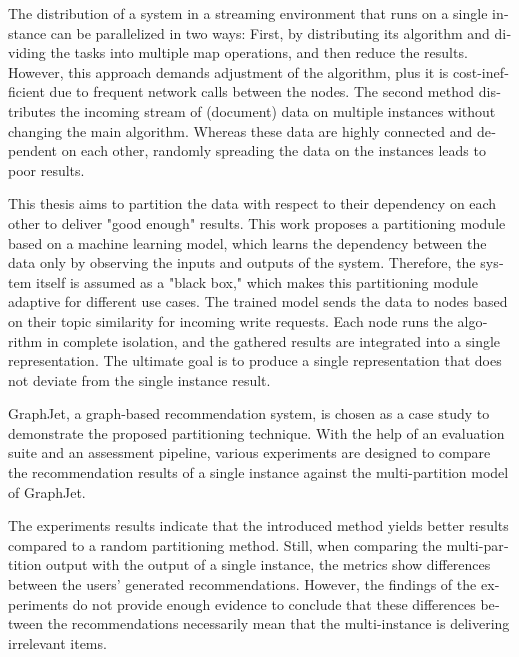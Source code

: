 
\null\vfil
\begin{otherlanguage}{english}
\begin{center}\textsf{\textbf{\abstractname}}\end{center}

\noindent
The distribution of a system in a streaming environment that runs on a single instance can be parallelized in two ways: First, by distributing its algorithm and dividing the tasks into multiple map operations, and then reduce the results. However, this approach demands adjustment of the algorithm, plus it is cost-inefficient due to frequent network calls between the nodes. The second method distributes the incoming stream of (document) data on multiple instances without changing the main algorithm. Whereas these data are highly connected and dependent on each other, randomly spreading the data on the instances leads to poor results.

This thesis aims to partition the data with respect to their dependency on each other to deliver "good enough" results. This work proposes a partitioning module based on a machine learning model, which learns the dependency between the data only by observing the inputs and outputs of the system. Therefore, the system itself is assumed as a "black box," which makes this partitioning module adaptive for different use cases. The trained model sends the data to nodes based on their topic similarity for incoming write requests. Each node runs the algorithm in complete isolation, and the gathered results are integrated into a single representation. The ultimate goal is to produce a single representation that does not deviate from the single instance result.

GraphJet, a graph-based recommendation system, is chosen as a case study to demonstrate the proposed partitioning technique. With the help of an evaluation suite and an assessment pipeline, various experiments are designed to compare the recommendation results of a single instance against the multi-partition model of GraphJet.


The experiments results indicate that the introduced method yields better results compared to a random partitioning method. Still, when comparing the multi-partition output with the output of a single instance, the metrics show differences between the users' generated recommendations. However, the findings of the experiments do not provide enough evidence to conclude that these differences between the recommendations necessarily mean that the multi-instance is delivering irrelevant items.


\end{otherlanguage}
\vfil\null
\newpage


